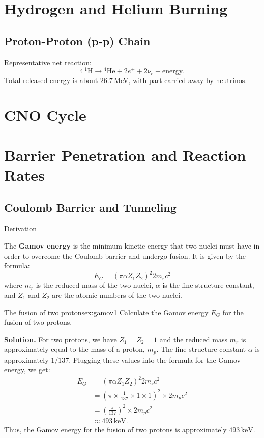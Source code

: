 \section{Hydrogen and Helium Burning}
\subsection{Proton-Proton (p-p) Chain}

\begin{foundation}
Representative net reaction:
\begin{equation}
    4\,{}^1\text{H}\rightarrow{}^4\text{He}+2e^++2\nu_e+\text{energy}.
\end{equation}
Total released energy is about $26.7\,$MeV, with part carried away by neutrinos.
\end{foundation}

\section{CNO Cycle}


\section{Barrier Penetration and Reaction Rates}

\subsection{Coulomb Barrier and Tunneling}
Derivation

\begin{foundation}
The \textbf{Gamov energy} is the minimum kinetic energy that two nuclei must have in order to overcome the Coulomb barrier and undergo fusion. It is given by the formula:
\begin{equation}    
E_G = (\pi \alpha Z_1 Z_2)^2 2 m_{r}c^2
\end{equation} 
where $m_r$ is the reduced mass of the two nuclei, $\alpha$ is the fine-structure constant, and $Z_1$ and $Z_2$ are the atomic numbers of the two nuclei.
\end{foundation}
\begin{example}{The fusion of two protons}{ex:gamov1}
Calculate the Gamov energy $E_G$ for the fusion of two protons.

\smallskip\textbf{Solution.}
For two protons, we have $Z_1 = Z_2 = 1$ and the reduced mass $m_r$ is approximately equal to the mass of a proton, $m_p$. The fine-structure constant $\alpha$ is approximately $1/137$. Plugging these values into the formula for the Gamov energy, we get:
\begin{align*}
E_G &= (\pi \alpha Z_1 Z_2)^2 2 m_{r}c^2 \\
&= (\pi \times \frac{1}{137} \times 1 \times 1)^2 \times 2 m_p c^2 \\
&= \left(\frac{\pi}{137}\right)^2 \times 2 m_p c^2 \\
&\approx 493\,\text{keV}.
\end{align*}
Thus, the Gamov energy for the fusion of two protons is approximately $493\,\text{keV}$.
\end{example}

